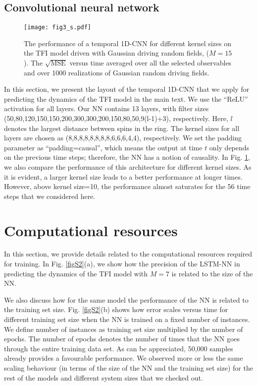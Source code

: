 \documentclass[a4paper,aps,amsmath,amssymb,twocolumn,longbibliography,,accepted=2022-05-17]{quantumarticle}
\begin{document}
\subsection{Convolutional neural network}

\begin{figure}
	\centering
	\texttt{[image: fig3\_s.pdf]}
	\caption{The performance of a temporal 1D-CNN for different kernel sizes on the TFI model driven with  Gaussian driving random fields, ($M=15$). The $\sqrt{\textrm{MSE}}$ versus time averaged over all the selected observables and over 1000 realizations of Gaussian random driving fields.}
	\label{figS3}
\end{figure}


In this section, we present the layout of the temporal 1D-CNN that we apply for predicting the dynamics of the TFI model in the main text. We use the ``$\mathrm{ReLU}$'' activation for all layers. Our NN contains 13 layers, with filter sizes (50,80,120,150,150,200,300,300,200,150,80,50,9(l-1)+3), respectively. Here, $l$ denotes the largest distance between spins in the ring. The kernel sizes for all layers are chosen as (8,8,8,8,8,8,8,8,6,6,6,4,4), respectively. We set the padding parameter as ``padding=causal'', which means the output at time $t$ only depends on the previous time steps; therefore, the NN has a notion of causality. In Fig. \ref{figS3}, we also compare the performance of this architecture for different kernel sizes. As it is evident, a larger kernel size leads to a better performance at longer times. However, above kernel size=10, the performance almost saturates for the 56 time steps that we considered here.



\section{Computational resources}

In this section, we provide details related to the computational resources required for training. In Fig. \ref{figS2}(a), we show how the precision of the LSTM-NN in predicting the dynamics of the TFI model with $M=7$ is related to the size of the NN.

We also discuss how for the same model the performance of the NN is related to the training set size. Fig. \ref{figS2}(b) shows how error scales versus time for different training set size when the NN is trained on a fixed number of instances. We define number of instances as training set size multiplied by the number of epochs. The number of epochs denotes the number of times that the NN goes through the entire training data set.  As can be appreciated, 50,000 samples already provides a favourable performance. We observed more or less the same scaling behaviour (in terms of the size of the NN and the training set size) for the rest of the models and different system sizes that we checked out.
\end{document}
